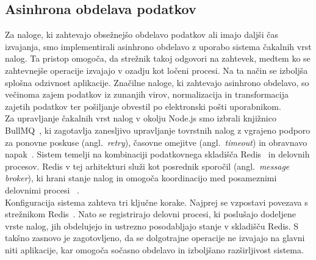 \documentclass[a4paper,12pt,openright]{book}
\begin{document}
\subsection{Asinhrona obdelava podatkov}
Za naloge, ki zahtevajo obsežnejšo obdelavo podatkov ali imajo daljši čas
izvajanja, smo implementirali asinhrono obdelavo z uporabo sistema čakalnih
vrst nalog. Ta pristop omogoča, da strežnik takoj odgovori na zahtevek,
medtem ko se zahtevnejše operacije izvajajo v ozadju kot ločeni procesi. Na ta
način se izboljša splošna odzivnost
aplikacije. Značilne naloge, ki zahtevajo
asinhrono obdelavo, so večinoma zajem podatkov iz zunanjih virov,
normalizacija in transformacija zajetih podatkov ter pošiljanje obvestil
po elektronski pošti uporabnikom.\\
Za upravljanje čakalnih vrst nalog v okolju Node.js smo izbrali knjižnico
BullMQ~\cite{bullmq-docs}, ki zagotavlja zanesljivo upravljanje tovrstnih nalog z vgrajeno
podporo za ponovne poskuse (angl.\ \textit{retry}), časovne omejitve (angl.\
\textit{timeout}) in obravnavo napak~\cite{bullmq-docs}. Sistem temelji na
kombinaciji podatkovnega skladišča Redis~\cite{redis-data-store} in delovnih procesov. Redis v tej
arhitekturi služi kot posrednik sporočil (angl.\ \textit{message broker}), ki
hrani stanje nalog in omogoča koordinacijo med posameznimi delovnimi procesi
~\cite{redis-data-store}.\\
Konfiguracija sistema zahteva tri ključne korake. Najprej se vzpostavi
povezava s strežnikom Redis~\cite{redis-data-store}. Nato se registrirajo
delovni procesi, ki poslušajo dodeljene vrste nalog, jih obdelujejo in
ustrezno posodabljajo stanje v skladišču Redis. S takšno zasnovo je
zagotovljeno, da se dolgotrajne operacije ne izvajajo na glavni niti
aplikacije, kar omogoča sočasno obdelavo in izboljšano razširljivost sistema.
\end{document}
